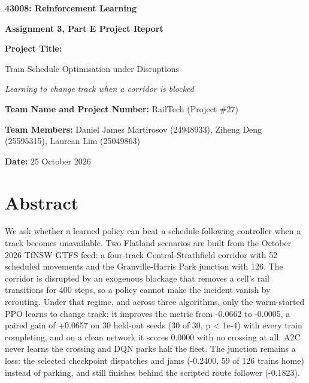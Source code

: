 \documentclass[11pt,a4paper]{article}
\begin{document}
\thispagestyle{empty}
\begin{center}
{\Large\bfseries 43008: Reinforcement Learning\par}
\vspace{0.6em}
{\large\bfseries Assignment 3, Part E Project Report\par}
\vspace{4cm}
{\bfseries Project Title:\par}
{\Large Train Schedule Optimisation under Disruptions\par}
\vspace{0.4em}
{\itshape Learning to change track when a corridor is blocked\par}
\vfill
{\bfseries Team Name and Project Number:} RailTech (Project \#27)\par
\vspace{0.4em}
{\bfseries Team Members:} Daniel James Martirosov (24948933), Ziheng Deng (25595315),
Laurean Lim (25049863)\par
\vspace{0.4em}
{\bfseries Date:} 25 October 2026\par
\vspace{2cm}
\end{center}
\clearpage

\tableofcontents
\clearpage

\section*{Abstract}

We ask whether a learned policy can beat a schedule-following controller when a track becomes unavailable. Two Flatland scenarios are built from the October 2026 TfNSW GTFS feed: a four-track Central-Strathfield corridor with 52 scheduled movements and the Granville-Harris Park junction with 126. The corridor is disrupted by an exogenous blockage that removes a cell's rail transitions for 400 steps, so a policy cannot make the incident vanish by rerouting. Under that regime, and across three algorithms, only the warm-started PPO learns to change track: it improves the metric from -0.0662 to -0.0005, a paired gain of +0.0657 on 30 held-out seeds (30 of 30, p < 1e-4) with every train completing, and on a clean network it scores 0.0000 with no crossing at all. A2C never learns the crossing and DQN parks half the fleet. The junction remains a loss: the selected checkpoint dispatches and jams (-0.2400, 59 of 126 trains home) instead of parking, and still finishes behind the scripted route follower (-0.1823).
\end{document}
